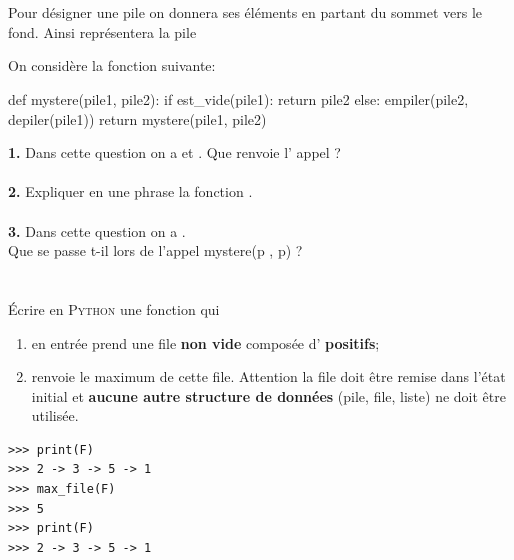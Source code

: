\documentclass[a4paper,10pt,french]{book}
\begin{document}
\\

\exo\\
Pour désigner une pile on donnera ses éléments en partant du sommet vers le fond. Ainsi  représentera la pile 
\begin{center}
\end{center}

On considère la fonction suivante:

\begin{pythoncode}
def mystere(pile1, pile2):
    if est_vide(pile1):
        return pile2
    else:
        empiler(pile2, depiler(pile1))       
        return mystere(pile1, pile2)
    \end{pythoncode}

\textbf{1.} Dans cette question on a  et . Que renvoie l' appel  ?\\

\\
 
\textbf{2.} Expliquer en une phrase la fonction .\\

\\

\textbf{3.} Dans cette question on a .\\
    Que se passe t-il lors de l’appel mystere(p , p) ?\\

\\

\exo\\
\'Ecrire en \textsc{Python} une fonction  qui
\begin{enumerate}[--]
    \item 	en entrée prend une file \textbf{non vide} composée d' \textbf{positifs};
    \item 	renvoie le maximum de cette file. Attention la file doit être remise dans l'état initial et \textbf{aucune autre structure de données} (pile, file, liste) ne doit être utilisée.
\end{enumerate}

\begin{exemple}[ d'utilisation]
\begin{verbatim}
>>> print(F)
>>> 2 -> 3 -> 5 -> 1
>>> max_file(F)
>>> 5
>>> print(F)
>>> 2 -> 3 -> 5 -> 1
\end{verbatim}
\end{exemple}

\end{document}
